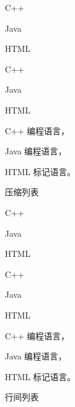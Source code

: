 \begin{example}[!h]
\begin{RLDemo}[numbers=left]
\begin{compactitem}
  \item C++
  \item Java 
  \item HTML
\end{compactitem}
\end{RLDemo}
\begin{RLDemo}[numbers=left]
\begin{compactenum}
  \item C++
  \item Java 
  \item HTML
\end{compactenum}
\end{RLDemo}
\begin{RLDemo}[numbers=left]
\begin{compactdesc}
  \item[C++] 编程语言，
  \item[Java] 编程语言，
  \item[HTML] 标记语言。
\end{compactdesc}
\end{RLDemo}
\caption{压缩列表}
\label{exa:compact_list}
\end{example}

\begin{example}[!h]
\begin{RLDemo}[numbers=left]
\begin{inparaitem}
  \item C++
  \item Java 
  \item HTML
\end{inparaitem}
\end{RLDemo}
\begin{RLDemo}[numbers=left]
\begin{inparaenum}
  \item C++
  \item Java 
  \item HTML
\end{inparaenum}
\end{RLDemo}
\begin{RLDemo}[numbers=left]
\begin{inparadesc}
  \item[C++] 编程语言，
  \item[Java] 编程语言，
  \item[HTML] 标记语言。
\end{inparadesc}
\end{RLDemo}
\caption{行间列表}
\label{exa:inline_list}
\end{example}

